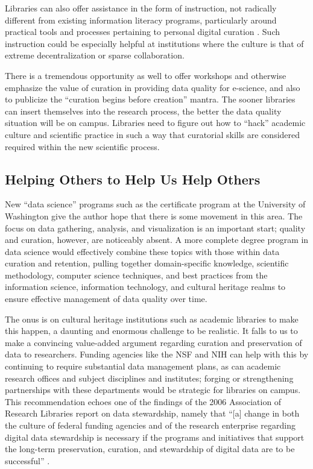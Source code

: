 \documentclass[man,12pt,biblatex]{apa6}
\begin{document}
Libraries can also offer assistance in the form of instruction, not
radically different from existing information literacy programs,
particularly around practical tools and processes pertaining to
personal digital curation \parencite{williams:lifecycle}. Such instruction
could be especially helpful at institutions where the culture is that
of extreme decentralization or sparse collaboration.

There is a tremendous opportunity as well to offer workshops and
otherwise emphasize the value of curation in providing data quality
for e-science, and also to publicize the ``curation begins before
creation'' mantra. The sooner libraries can insert themselves into the
research process, the better the data quality situation will be on
campus. Libraries need to figure out how to ``hack'' academic culture
and scientific practice in such a way that curatorial skills are
considered required within the new scientific process.

\subsection{Helping Others to Help Us Help Others}

New ``data science'' programs such as the certificate program at the
University of Washington \parencite{uw:datascience} give the author hope
that there is some movement in this area. The focus on data gathering,
analysis, and visualization is an important start; quality and
curation, however, are noticeably absent. A more complete degree
program in data science would effectively combine these topics with
those within data curation and retention, pulling together
domain-specific knowledge, scientific methodology, computer science
techniques, and best practices from the information science,
information technology, and cultural heritage realms to ensure
effective management of data quality over time.

The onus is on cultural heritage institutions such as academic
libraries to make this happen, a daunting and enormous challenge to be
realistic. It falls to us to make a convincing value-added argument
regarding curation and preservation of data to researchers. Funding
agencies like the NSF and NIH can help with this by continuing to
require substantial data management plans, as can academic research
offices and subject disciplines and institutes; forging or
strengthening partnerships with these departments would be strategic
for libraries on campus. This recommendation echoes one of the
findings of the 2006 Association of Research Libraries report on data
stewardship, namely that ``[a] change in both the culture of federal
funding agencies and of the research enterprise regarding digital data
stewardship is necessary if the programs and initiatives that support
the long-term preservation, curation, and stewardship of digital data
are to be successful'' \parencite{arl:stewardship}.
\end{document}
